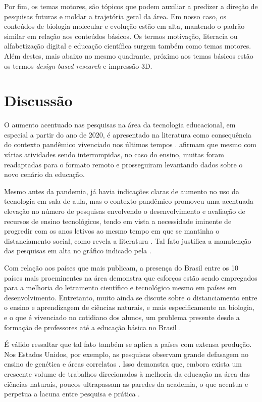 \documentclass[portuguese]{textolivre}
\begin{document}
Por fim, os temas motores, são tópicos que podem auxiliar a predizer a direção de pesquisas futuras e moldar a trajetória geral da área. Em nosso caso, os conteúdos de biologia molecular e evolução estão em alta, mantendo o padrão similar em relação aos conteúdos básicos. Os termos motivação, literacia ou alfabetização digital e educação científica surgem também como temas motores. Além destes, mais abaixo no mesmo quadrante, próximo aos temas básicos estão os termos \textit{design-based research} e impressão 3D.

\section{Discussão}
O aumento acentuado nas pesquisas na área da tecnologia educacional, em especial a partir do ano de 2020, é apresentado na literatura como consequência do contexto pandêmico vivenciado nos últimos tempos \cite{ibanez_educacion_2020}. \textcite{garcia_percepcao_2022} afirmam que mesmo com várias atividades sendo interrompidas, no caso do ensino, muitas foram readaptadas para o formato remoto e prosseguiram levantando dados sobre o novo cenário da educação.

Mesmo antes da pandemia, já havia indicações claras de aumento no uso da tecnologia em sala de aula, mas o contexto pandêmico promoveu uma acentuada elevação no número de pesquisas envolvendo o desenvolvimento e avaliação de recursos de ensino tecnológicos, tendo em vista a necessidade iminente de progredir com os anos letivos ao mesmo tempo em que se mantinha o distanciamento social, como revela a literatura \cite{ibanez_educacion_2020}. Tal fato justifica a manutenção das pesquisas em alta no gráfico indicado pela .

Com relação aos países que mais publicam, a presença do Brasil entre os 10 países mais proeminentes na área demonstra que esforços estão sendo empregados para a melhoria do letramento científico e tecnológico mesmo em países em desenvolvimento. Entretanto, muito ainda se discute sobre o distanciamento entre o ensino e aprendizagem de ciências naturais, e mais especificamente na biologia, e o que é vivenciado no cotidiano dos alunos, um problema presente desde a formação de professores até a educação básica no Brasil \cite{moura_biologia/genetica:_2013,pereira_estrategias_2020}.

É válido ressaltar que tal fato também se aplica a países com extensa produção. Nos Estados Unidos, por exemplo, as pesquisas observam grande defasagem no ensino de genética e áreas correlatas \cite{barros_o_2017}. Isso demonstra que, embora exista um crescente volume de trabalhos direcionados à melhoria da educação na área das ciências naturais, poucos ultrapassam as paredes da academia, o que acentua e perpetua a lacuna entre pesquisa e prática \cite{lawlor_approaches_2019}.
\end{document}
